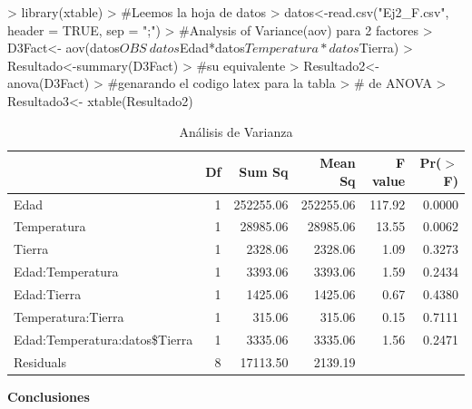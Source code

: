 \documentclass[12pt,letterpaper]{report}
\begin{document}
\begin{Schunk}
\begin{Sinput}
> library(xtable)
> #Leemos la hoja de datos
> datos<-read.csv("Ej2_F.csv", header = TRUE, sep = ";")
> #Analysis of Variance(aov) para 2 factores
> D3Fact<- aov(datos$OBS~ datos$Edad*datos$Temperatura*datos$Tierra)
> Resultado<-summary(D3Fact)
> #su equivalente
> Resultado2<- anova(D3Fact)
> #genarando el codigo latex para la tabla
> # de ANOVA
> Resultado3<- xtable(Resultado2) 
\end{Sinput}
\end{Schunk}

\begin{table}[ht]
\centering
\begin{tabular}{lrrrrr}
  \hline
 & Df & Sum Sq & Mean Sq & F value & Pr($>$F) \\ 
  \hline
Edad & 1 & 252255.06 & 252255.06 & 117.92 & 0.0000 \\ 
Temperatura & 1 & 28985.06 & 28985.06 & 13.55 & 0.0062 \\ 
Tierra & 1 & 2328.06 & 2328.06 & 1.09 & 0.3273 \\ 
Edad:Temperatura & 1 & 3393.06 & 3393.06 & 1.59 & 0.2434 \\ 
Edad:Tierra & 1 & 1425.06 & 1425.06 & 0.67 & 0.4380 \\ 
Temperatura:Tierra & 1 & 315.06 & 315.06 & 0.15 & 0.7111 \\ 
Edad:Temperatura:datos\$Tierra & 1 & 3335.06 & 3335.06 & 1.56 & 0.2471 \\ 
Residuals & 8 & 17113.50 & 2139.19 &  &  \\ 
   \hline
\end{tabular}
\caption{Análisis de Varianza}
\end{table}

\textbf{Conclusiones}
\end{document}
